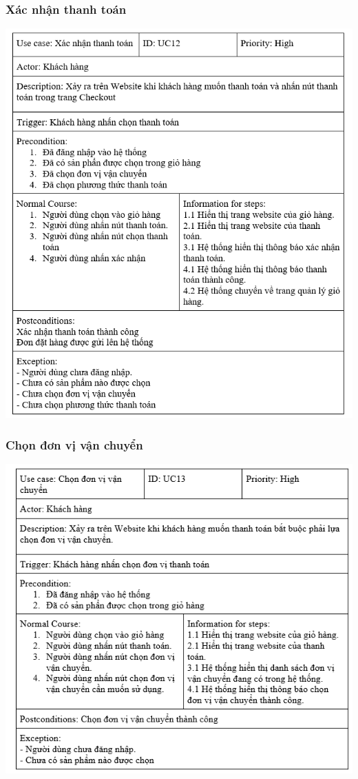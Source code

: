 \documentclass[12pt,a4paper,2sides]{report}
\begin{document}
\subsubsection{Xác nhận thanh toán}
    \includegraphics[width=1\linewidth]{lib/usecase/xacnhantt.png}\\\vspace*{1cm}
\subsubsection{Chọn đơn vị vận chuyển}
    \includegraphics[width=1\linewidth]{lib/usecase/chondvvc.png}\\\vspace*{1cm}
\end{document}
